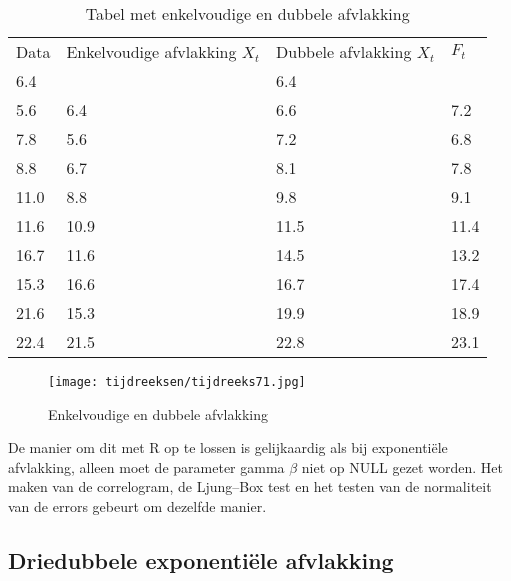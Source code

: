 \begin{table}
  \centering
  \begin{tabular}{|llll|}
    \hline
    Data & Enkelvoudige afvlakking $X_{t}$ & Dubbele afvlakking $X_{t}$ & $F_{t}$ \\
    6.4  & ~                      & 6.4              & ~                             \\
    5.6  & 6.4                    & 6.6              & 7.2                           \\
    7.8  & 5.6                    & 7.2              & 6.8                           \\
    8.8  & 6.7                    & 8.1              & 7.8                           \\
    11.0 & 8.8                    & 9.8              & 9.1                           \\
    11.6 & 10.9                   & 11.5             & 11.4                          \\
    16.7 & 11.6                   & 14.5             & 13.2                          \\
    15.3 & 16.6                   & 16.7             & 17.4                          \\
    21.6 & 15.3                   & 19.9             & 18.9                          \\
    22.4 & 21.5                   & 22.8             & 23.1                          \\ \hline
  \end{tabular}
  \caption{Tabel met enkelvoudige en dubbele afvlakking}
  \label{tab:doubleSingle}
\end{table}

\begin{figure}
	\centering
		\texttt{[image: tijdreeksen/tijdreeks71.jpg]}
	\caption{Enkelvoudige en dubbele afvlakking}
	\label{fig:tijdreeks71}
\end{figure}

De manier om dit met R op te lossen is gelijkaardig als bij exponentiële afvlakking, alleen moet de parameter gamma $\beta$ niet op NULL gezet worden. Het maken van de correlogram, de Ljung–Box test en het testen van de normaliteit van de errors gebeurt om dezelfde manier. 

\subsection{Driedubbele exponentiële afvlakking}

